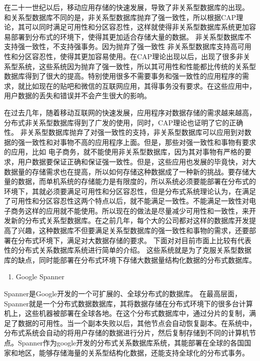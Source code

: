 在二十一世纪以后，移动应用存储的快速发展，导致了非关系型数据库的出现。
和关系型数据库不同的是，非关系型数据库抛弃了强一致性，所以根据CAP理论，其可以同时满足可用性和分区容忍性，这样就使得非关系型数据库系统更加容易部署到分布式的环境下，使得其更加适合存储大量的数据。 非关系型数据库不支持强一致性，不支持强事务。因为抛弃了强一致性
非关系型数据库支持高可用性和分区容忍性，使得其更加容易使用。在CAP理论出现以后，出现了很多非关系型系统，这些系统因为抛弃了强一致性，所以其可用性和性能都比传统的关系型数据库得到了很大的提高。特别使用很多不需要事务和强一致性的应用程序的需求，就比如现在的贴吧和微信的互联网应用，其得事务没有要求。在这些应用中，用户数据的丢失和错误并不会产生很大的影响。


在过去几年，随着移动互联网的快速发展，应用程序对数据存储的需求越来越高，分布式非关系型数据库得到了广发的使用，同时，CAP理论也证明了它的正确性。
非关系型数据库抛弃了对强一致性的支持，非关系型数据库可以应用到对数据的强一致性和对事物不高的应用程序上面。但是，那些对强一致性和事物有要求的应用，比如
电子商务，就不能使用非关系型数据库，因为其对事物有严格的要求，用户数据要保证正确和保证强一致性。但是，这些应用也发展的毕竟快，对大数据量的存储需求也在提高，所以如何存储这种数据成了一种新的挑战。要存储大量的数据，而单机系统的存储能力是有限度的，所以系统必须要能部署在分布式的环境下，其就必须要满足可用性和分区容忍性，但是分布式系统理论认为，在满足了可用性和分区容忍性这两个特点以后，就不能满足一致性。不能满足一致性对电子商务这样的应用就不能使用。所以现在的做法是尽量减少可用性和一致性，来开发新的分布式关系型数据库。在之前几年，每个大的公司都对这样的数据库开发提高了兴趣，这种数据库不但要满足关系型数据库的强一致性和事物的需求，还要部署在分布式环境下，满足对大数据存储的要求。
下面对对目前市面上比较有代表性的分布式关系数据库系统进行简单的介绍。
这些系统就是为了克服关系型数据库的缺点，同时能部署在分布式环境下存储大数据量结构化数据的分布式数据库。

\begin{enumerate}
	\item Google Spanner
\end{enumerate}

	Spanner是Google开发的一个可扩展的、全球分布式的数据库。
	在最高层面，Spanner就是一个分布式数据数据库，其将数据存储在分布式环境下的很多台计算机上，这些机器被部署在全球各地。在这个分布式数据库中，通过分片的复制，满足了数据的可用性。当一个副本失败以后，其他节点会自动恢复副本。在系统中，分布式系统会自动的将用户存储的数据进行分片，然后复制存储到不同的计算机节点。Spanner作为google开发的分布式关系数据库系统，其能部署在全球的各国国家和地区，能够存储海量的关系型结构化数据，还能支持全球化的分布式事务。
		

